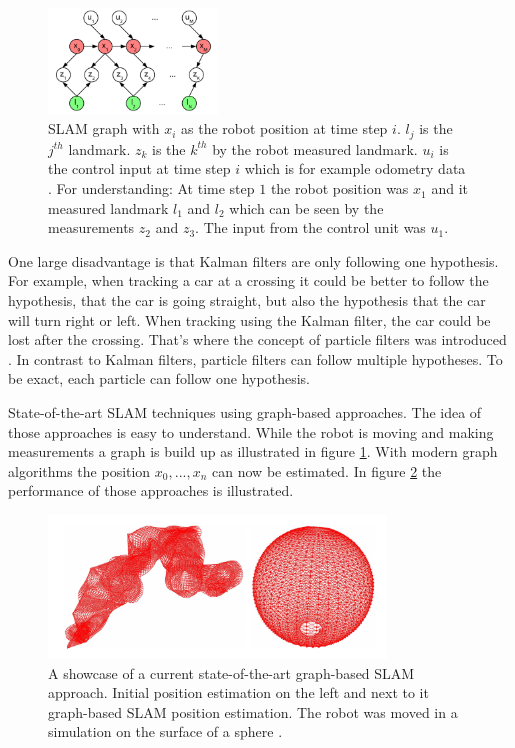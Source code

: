 \begin{figure}[h!]
	\centering
	\captionsetup{justification=centering,margin=0.5cm}
	\includegraphics[width=0.4\textwidth]{images/kaess_slam_graph.png}
	\caption{
		SLAM graph with $x_i$ as the robot position at time step $i$. $l_j$ is the $j^{th}$ landmark. $z_k$ is the $k^{th}$ by the robot measured landmark. $u_i$ is the control input at time step $i$ which is for example odometry data \cite{kaess_isam:_2008}. For understanding: At time step $1$ the robot position was $x_1$ and it measured landmark $l_1$ and $l_2$ which can be seen by the measurements $z_2$ and $z_3$. The input from the control unit was $u_1$.
	}
	\label{fig:kaess_slam_graph}
\end{figure}

One large disadvantage is that Kalman filters are only following one hypothesis. For example, when tracking a car at a crossing it could be better to follow the hypothesis, that the car is going straight, but also the hypothesis that the car will turn right or left. When tracking using the Kalman filter, the car could be lost after the crossing. That's where the concept of particle filters was introduced \cite{qun_particle_filter}. In contrast to Kalman filters, particle filters can follow multiple hypotheses. To be exact, each particle can follow one hypothesis.

State-of-the-art SLAM techniques using graph-based approaches.  The idea of those approaches is easy to understand. While the robot is moving and making measurements a graph is build up as illustrated in figure \ref{fig:kaess_slam_graph}. With modern graph algorithms the position $x_0, ... , x_n$ can now be estimated. In figure \ref{fig:grisetti_slam_showcase} the performance of those approaches is illustrated.

\begin{figure}[h!]
	\centering
	\captionsetup{justification=centering,margin=0.5cm}
	\includegraphics[width=0.8\textwidth]{images/grisetti_slam_showcase.png}
	\caption{
		A showcase of a current state-of-the-art graph-based SLAM approach. Initial position estimation on the left and next to it graph-based SLAM position estimation. The robot was moved in a simulation on the surface of a sphere \cite{grisetti_tutorial_2010}.
	}
	\label{fig:grisetti_slam_showcase}
\end{figure}

